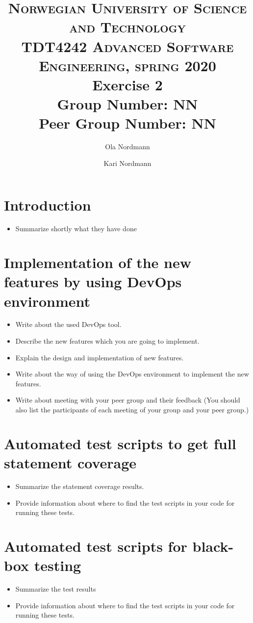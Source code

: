 \documentclass{article}
\title{\textsc{ \normalsize Norwegian University of Science and Technology\\
TDT4242 Advanced Software Engineering, spring 2020}\\[0.5cm]
\LARGE \textbf{Exercise 2}\\
\large \textbf{Group Number: NN}\\%
\textbf{Peer Group Number: NN}%
}
\author{Ola Nordmann \and Kari Nordmann} %
\begin{document}
\maketitle

\section{Introduction}
\begin{itemize}
    \item Summarize shortly what they have done
\end{itemize}


\section{Implementation of the new features by using DevOps environment}
\begin{itemize}
    \item Write about the used DevOps tool.
    \item Describe the new features which you are going to implement.
    \item Explain the design and implementation of new features.
    \item Write about the way of using the DevOps environment to implement the new features.
    \item Write about meeting with your peer group and their feedback (You should also list the participants of each meeting of your group and your peer group.)
\end{itemize}


\section{Automated test scripts to get full statement coverage}
\begin{itemize}
    \item Summarize the statement coverage results.
    \item Provide information about where to find the test scripts in your code for running these tests.
\end{itemize}


\section{Automated test scripts for black-box testing}
\begin{itemize}
    \item Summarize the test results
    \item Provide information about where to find the test scripts in your code for running these tests.
\end{itemize}
\end{document}
